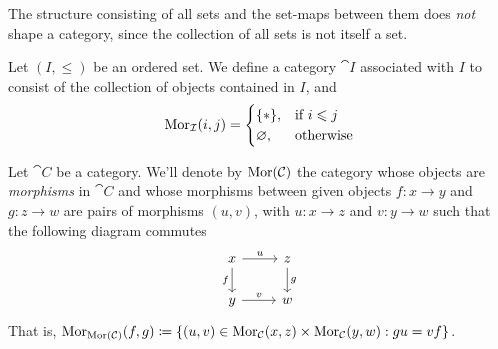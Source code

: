 \begin{remark}
The structure consisting of all sets and the set-maps between them does
\emph{not} shape a category, since the collection of all sets is not itself a
set.
\end{remark}

\begin{example}
\label{exp:order-category}
Let \((I, \leq)\) be an ordered set. We define a category \(\cat I\)
associated with \(I\) to consist of the collection of objects contained in
\(I\), and
\[
  \operatorname{Mor}_{\mathcal I}(i, j) =
  \begin{cases}
    \{*\}, &\text{if } i \leqslant j \\
    \varnothing, &\text{otherwise}
  \end{cases}
\]
\end{example}

\begin{definition}
\label{def:morphism-category}
Let \(\cat C\) be a category. We'll denote by \(\operatorname{Mor}(\mathcal C)\) the category
whose objects are \emph{morphisms} in \(\cat C\) and whose morphisms between
given objects \(f: x \to y\) and \(g: z \to w\) are pairs of morphisms \((u,
v)\), with \(u: x \to z\) and \(v: y \to w\) such that the following diagram
commutes
\[
  \begin{tikzcd}
    x \ar[d, swap, "f"] \ar[r, "u"] &z \ar[d, "g"] \\
    y \ar[r, "v"] &w
  \end{tikzcd}
\]
That is, \(\operatorname{Mor}_{\operatorname{Mor}(\mathcal C)}(f, g) \coloneq \{(u, v) \in \operatorname{Mor}_{\mathcal C}(x, z)
\times \operatorname{Mor}_{\mathcal C}(y, w) : g u = v f\}\).
\end{definition}

